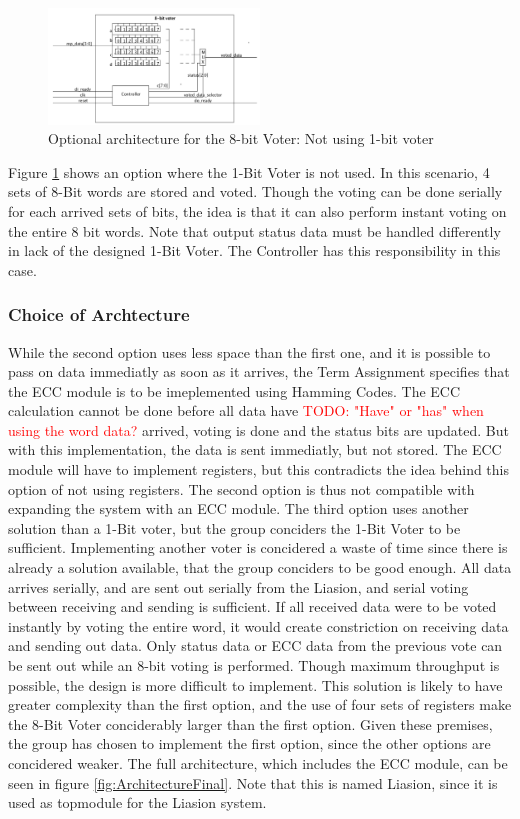 \documentclass[a4paper]{IEEEtran}
\newcommand\TODO[1]{\textcolor{red}{TODO:#1}}
\newcommand\todo[1]{\TODO{#1}}
\begin{document}
\begin{figure}[h!]
    \centering
    \includegraphics[width=0.5\textwidth]{Figures/Solution/ArchitectureOption3}
    \caption{Optional architecture for the 8-bit Voter: Not using 1-bit voter}
    \label{fig:ArchitectureOption3}
\end{figure}
Figure \ref{fig:ArchitectureOption3} shows an option where the 1-Bit Voter is not used. In this scenario, 4 sets of 8-Bit words are stored and voted.
Though the voting can be done serially for each arrived sets of bits, the idea is that it can also perform instant voting on the entire 8 bit words.
Note that output status data must be handled differently in lack of the designed 1-Bit Voter.
The Controller has this responsibility in this case.

\subsubsection{Choice of Archtecture}
While the second option uses less space than the first one, and it is possible to pass on data immediatly as soon as it arrives, the Term Assignment specifies that the ECC module is to be imeplemented using Hamming Codes.
The ECC calculation cannot be done before all data have \todo{ "Have" or "has" when using the word data?} arrived, voting is done and the status bits are updated.
But with this implementation, the data is sent immediatly, but not stored.
The ECC module will have to implement registers, but this contradicts the idea behind this option of not using registers.
The second option is thus not compatible with expanding the system with an ECC module.
\break
The third option uses another solution than a 1-Bit voter, but the group conciders the 1-Bit Voter to be sufficient.
Implementing another voter is concidered a waste of time since there is already a solution available, that the group conciders to be good enough.
All data arrives serially, and are sent out serially from the Liasion, and serial voting between receiving and sending is sufficient.
If all received data were to be voted instantly by voting the entire word, it would create constriction on receiving data and sending out data.
Only status data or ECC data from the previous vote can be sent out while an 8-bit voting is performed.
Though maximum throughput is possible, the design is more difficult to implement.
This solution is likely to have greater complexity than the first option, and the use of four sets of registers make the 8-Bit Voter conciderably larger than the first option.
Given these premises, the group has chosen to implement the first option, since the other options are concidered weaker.
The full architecture, which includes the ECC module, can be seen in figure \ref{fig:ArchitectureFinal}.
Note that this is named Liasion, since it is used as topmodule for the Liasion system.
\end{document}
